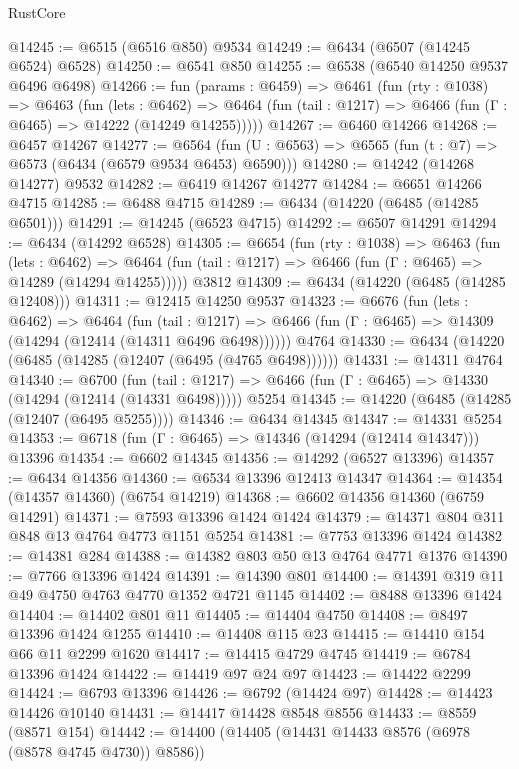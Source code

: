 \begin{lexlean}{RustCore}
\begin{coremodule}
@14245 := @6515 (@6516 @850) @9534
@14249 := @6434 (@6507 (@14245 @6524) @6528)
@14250 := @6541 @850
@14255 := @6538 (@6540 @14250 @9537 @6496 @6498)
@14266 := fun (params : @6459) =>
  @6461
    (fun (rty : @1038) =>
    @6463
      (fun (lets : @6462) =>
      @6464 (fun (tail : @1217) => @6466 (fun (Γ : @6465) => @14222 (@14249 @14255)))))
@14267 := @6460 @14266
@14268 := @6457 @14267
@14277 := @6564 (fun (U : @6563) => @6565 (fun (t : @7) => @6573 (@6434 (@6579 @9534 @6453) @6590)))
@14280 := @14242 (@14268 @14277) @9532
@14282 := @6419 @14267 @14277
@14284 := @6651 @14266 @4715
@14285 := @6488 @4715
@14289 := @6434 (@14220 (@6485 (@14285 @6501)))
@14291 := @14245 (@6523 @4715)
@14292 := @6507 @14291
@14294 := @6434 (@14292 @6528)
@14305 := @6654
    (fun (rty : @1038) =>
    @6463
      (fun (lets : @6462) =>
      @6464 (fun (tail : @1217) => @6466 (fun (Γ : @6465) => @14289 (@14294 @14255)))))
    @3812
@14309 := @6434 (@14220 (@6485 (@14285 @12408)))
@14311 := @12415 @14250 @9537
@14323 := @6676
    (fun (lets : @6462) =>
    @6464
      (fun (tail : @1217) =>
      @6466 (fun (Γ : @6465) => @14309 (@14294 (@12414 (@14311 @6496 @6498))))))
    @4764
@14330 := @6434 (@14220 (@6485 (@14285 (@12407 (@6495 (@4765 @6498))))))
@14331 := @14311 @4764
@14340 := @6700
    (fun (tail : @1217) => @6466 (fun (Γ : @6465) => @14330 (@14294 (@12414 (@14331 @6498)))))
    @5254
@14345 := @14220 (@6485 (@14285 (@12407 (@6495 @5255))))
@14346 := @6434 @14345
@14347 := @14331 @5254
@14353 := @6718 (fun (Γ : @6465) => @14346 (@14294 (@12414 @14347))) @13396
@14354 := @6602 @14345
@14356 := @14292 (@6527 @13396)
@14357 := @6434 @14356
@14360 := @6534 @13396 @12413 @14347
@14364 := @14354 (@14357 @14360) (@6754 @14219)
@14368 := @6602 @14356 @14360 (@6759 @14291)
@14371 := @7593 @13396 @1424 @1424
@14379 := @14371 @804 @311 @848 @13 @4764 @4773 @1151 @5254
@14381 := @7753 @13396 @1424
@14382 := @14381 @284
@14388 := @14382 @803 @50 @13 @4764 @4771 @1376
@14390 := @7766 @13396 @1424
@14391 := @14390 @801
@14400 := @14391 @319 @11 @49 @4750 @4763 @4770 @1352 @4721 @1145
@14402 := @8488 @13396 @1424
@14404 := @14402 @801 @11
@14405 := @14404 @4750
@14408 := @8497 @13396 @1424 @1255
@14410 := @14408 @115 @23
@14415 := @14410 @154 @66 @11 @2299 @1620
@14417 := @14415 @4729 @4745
@14419 := @6784 @13396 @1424
@14422 := @14419 @97 @24 @97
@14423 := @14422 @2299
@14424 := @6793 @13396
@14426 := @6792 (@14424 @97)
@14428 := @14423 @14426 @10140
@14431 := @14417 @14428 @8548 @8556
@14433 := @8559 (@8571 @154)
@14442 := @14400 (@14405 (@14431 @14433 @8576 (@6978 (@8578 @4745 @4730)) @8586))

\end{coremodule}
\end{lexlean}
